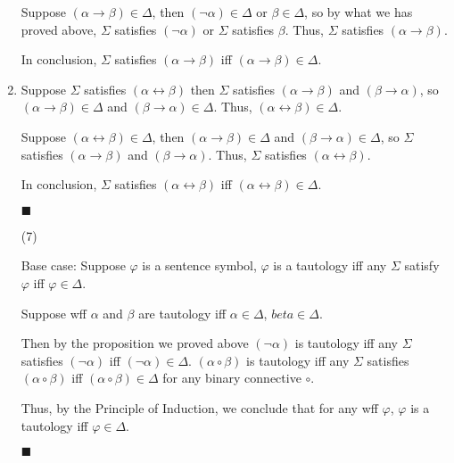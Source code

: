 \documentclass[11pt]{article}
\begin{document}
\begin{enumerate}[(1)]
				Suppose $(\alpha \rightarrow \beta) \in \Delta$, then $(\neg\alpha) \in \Delta$ or $\beta \in \Delta$, so by what we has proved above, $\Sigma$ satisfies $(\neg \alpha)$ or $\Sigma$ satisfies $\beta$. Thus, $\Sigma$ satisfies $(\alpha \rightarrow \beta)$.
				
				In conclusion, $\Sigma$ satisfies $(\alpha \rightarrow \beta)$ iff $(\alpha \rightarrow \beta) \in \Delta$.
			\item Suppose $\Sigma$ satisfies $(\alpha \leftrightarrow \beta)$ then $\Sigma$ satisfies $(\alpha \rightarrow \beta)$ and $(\beta \rightarrow \alpha)$, so $(\alpha \rightarrow \beta) \in \Delta$ and $(\beta \rightarrow \alpha) \in \Delta$. Thus, $(\alpha \leftrightarrow \beta) \in \Delta$.
			
			Suppose $(\alpha \leftrightarrow \beta) \in \Delta$, then $(\alpha \rightarrow \beta) \in \Delta$ and $(\beta \rightarrow \alpha) \in \Delta$, so $\Sigma$ satisfies $(\alpha \rightarrow \beta)$ and $(\beta \rightarrow \alpha)$. Thus, $\Sigma$ satisfies $(\alpha \leftrightarrow \beta)$.
			
			In conclusion, $\Sigma$ satisfies $(\alpha \leftrightarrow \beta)$ iff $(\alpha \leftrightarrow \beta) \in \Delta$.
			
			$\blacksquare$
			
			\item [(7)]
			
			Base case: Suppose $\varphi$ is a sentence symbol, $\varphi$ is a tautology iff any $\Sigma$ satisfy $\varphi$ iff $\varphi \in \Delta$.
			
			Suppose wff $\alpha$ and $\beta$ are tautology iff $\alpha \in \Delta$, $beta \in \Delta$.
			
			Then by the proposition we proved above $(\neg \alpha)$ is tautology iff any $\Sigma$ satisfies $(\neg \alpha)$ iff $(\neg \alpha) \in \Delta$. $(\alpha \circ \beta)$ is tautology iff any $\Sigma$ satisfies $(\alpha \circ \beta)$ iff $(\alpha \circ \beta) \in \Delta$ for any binary connective $\circ$.
			
			Thus, by the Principle of Induction, we conclude that for any wff $\varphi$, $\varphi$ is a tautology iff $\varphi \in \Delta$.
			
			$\blacksquare$
	\end{enumerate}
\end{document}
